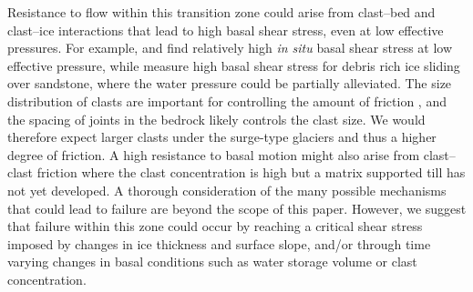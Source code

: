 \documentclass[review]{igs}
\begin{document}
Resistance to flow within this transition zone could arise from clast--bed and clast--ice interactions that lead to high basal shear stress, even at low effective pressures. For example, \cite{Iverson2003} and \cite{Cohen2005} find relatively high \emph{in situ} basal shear stress at low effective pressure, while \cite{Zoet2013} measure high basal shear stress for debris rich ice sliding over sandstone, where the water pressure could be partially alleviated. The size distribution of clasts are important for controlling the amount of friction \citep[e.g.][]{Cohen2005}, and the spacing of joints in the bedrock likely controls the clast size. We would therefore expect larger clasts under the surge-type glaciers and thus a higher degree of friction. A high resistance to basal motion might also arise from clast--clast friction where the clast concentration is high but a matrix supported till has not yet developed. A thorough consideration of the many possible mechanisms that could lead to failure are beyond the scope of this paper. However, we suggest that failure within this zone could occur by reaching a critical shear stress imposed by changes in ice thickness and surface slope, and/or through time varying changes in basal conditions such as water storage volume or clast concentration.
\end{document}

